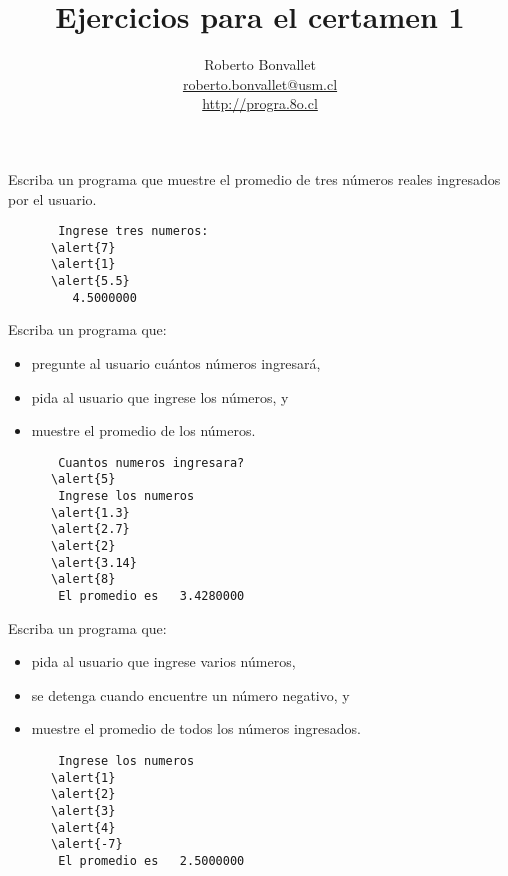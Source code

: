 \documentclass[10pt]{beamer}
\title{Ejercicios para el certamen 1}
\author{
  Roberto Bonvallet \\
  \url{roberto.bonvallet@usm.cl} \\
  \url{http://progra.8o.cl}
}
\begin{document}
  \begin{frame}
    \maketitle
  \end{frame}

  \begin{frame}[fragile]
    Escriba un programa
    que muestre el promedio de tres números reales
    ingresados por el usuario.

    \begin{Verbatim}
       Ingrese tres numeros:
      \alert{7}
      \alert{1}
      \alert{5.5}
         4.5000000
    \end{Verbatim}

\end{frame}

  \begin{frame}
    
  \end{frame}

  \begin{frame}[fragile]
    Escriba un programa que:
    \begin{itemize}
      \item pregunte al usuario cuántos números ingresará,
      \item pida al usuario que ingrese los números, y
      \item muestre el promedio de los números.
    \end{itemize}

    \begin{Verbatim}
       Cuantos numeros ingresara?
      \alert{5}
       Ingrese los numeros
      \alert{1.3}
      \alert{2.7}
      \alert{2}
      \alert{3.14}
      \alert{8}
       El promedio es   3.4280000
    \end{Verbatim}

\end{frame}

  \begin{frame}
    
  \end{frame}

  \begin{frame}[fragile]
    Escriba un programa que:
    \begin{itemize}
      \item pida al usuario que ingrese varios números,
      \item se detenga cuando encuentre un número negativo, y
      \item muestre el promedio de todos los números ingresados.
    \end{itemize}

    \begin{Verbatim}
       Ingrese los numeros
      \alert{1}
      \alert{2}
      \alert{3}
      \alert{4}
      \alert{-7}
       El promedio es   2.5000000
    \end{Verbatim}

\end{frame}
\end{document}
